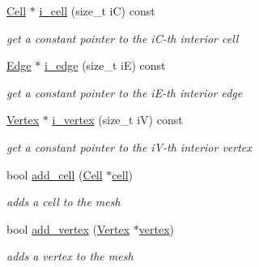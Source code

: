 \begin{DoxyCompactItemize}
\mbox{\label{classHArDCore2D_1_1Mesh_aee5a30682d86cd7c130667fd4fdf395f}} 
\hyperlink{classHArDCore2D_1_1Cell}{Cell} $\ast$ \hyperlink{classHArDCore2D_1_1Mesh_aee5a30682d86cd7c130667fd4fdf395f}{i\+\_\+cell} (size\+\_\+t iC) const
\begin{DoxyCompactList}\small\item\em get a constant pointer to the i\+C-\/th interior cell \end{DoxyCompactList}\item 
\mbox{\label{classHArDCore2D_1_1Mesh_acc84a2329361880a2f821d567149a1e8}} 
\hyperlink{classHArDCore2D_1_1Edge}{Edge} $\ast$ \hyperlink{classHArDCore2D_1_1Mesh_acc84a2329361880a2f821d567149a1e8}{i\+\_\+edge} (size\+\_\+t iE) const
\begin{DoxyCompactList}\small\item\em get a constant pointer to the i\+E-\/th interior edge \end{DoxyCompactList}\item 
\mbox{\label{classHArDCore2D_1_1Mesh_a58578f5f723f5e589ba498f74ddcbf08}} 
\hyperlink{classHArDCore2D_1_1Vertex}{Vertex} $\ast$ \hyperlink{classHArDCore2D_1_1Mesh_a58578f5f723f5e589ba498f74ddcbf08}{i\+\_\+vertex} (size\+\_\+t iV) const
\begin{DoxyCompactList}\small\item\em get a constant pointer to the i\+V-\/th interior vertex \end{DoxyCompactList}\item 
bool \hyperlink{group__Mesh_ga59082af6b1da515cdb99c4daacf5e2fd}{add\+\_\+cell} (\hyperlink{classHArDCore2D_1_1Cell}{Cell} $\ast$\hyperlink{classHArDCore2D_1_1Mesh_ae07b938c57cf57e3bb9c76d3df1eb549}{cell})
\begin{DoxyCompactList}\small\item\em adds a cell to the mesh \end{DoxyCompactList}\item 
bool \hyperlink{group__Mesh_ga9dc43dcebaa54356ddbaa45fbd94fa1a}{add\+\_\+vertex} (\hyperlink{classHArDCore2D_1_1Vertex}{Vertex} $\ast$\hyperlink{classHArDCore2D_1_1Mesh_ad099224c697c05a57fad6a47fdcd9e76}{vertex})
\begin{DoxyCompactList}\small\item\em adds a vertex to the mesh \end{DoxyCompactList}\item 

\end{DoxyCompactItemize}
